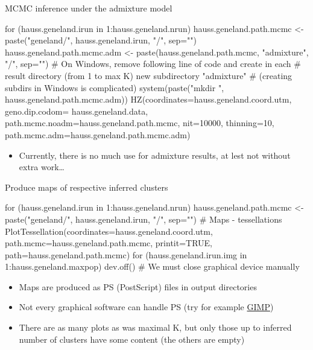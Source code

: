 \documentclass[compress, ucs, xelatex, 11pt, xcolor=svgnames,
  hyperref={
    bookmarks=true,
    unicode=true,
    colorlinks=true,
    pdftitle={Molecular data in R},
    plainpages=false,
    pdfauthor={Vojtech Zeisek},
    pdfsubject={Course about phylogeny and evolution in R},
    pdfcreator={XeLaTeX},
    pdfkeywords={R, evolution, phylogeny, molecular data},
    linkcolor=Tomato,
    anchorcolor=SaddleBrown,
    citecolor=Goldenrod,
    filecolor=DarkMagenta,
    menucolor=Sienna,
    urlcolor=DarkTurquoise,
    pdftex},
  url={hyphens, lowtilde} %
  ]{beamer}
\begin{document}
\begin{frame}[fragile]{MCMC inference under the admixture model}
  \begin{spluscode}
    for (hauss.geneland.irun in 1:hauss.geneland.nrun) {
      hauss.geneland.path.mcmc <- paste("geneland/",
        hauss.geneland.irun, "/", sep="")
      hauss.geneland.path.mcmc.adm <- paste(hauss.geneland.path.mcmc,
        "admixture", "/", sep="")
      # On Windows, remove following line of code and create in each
      # result directory (from 1 to max K) new subdirectory "admixture"
      # (creating subdirs in Windows is complicated)
      system(paste("mkdir ", hauss.geneland.path.mcmc.adm))
      HZ(coordinates=hauss.geneland.coord.utm, geno.dip.codom=
        hauss.geneland.data, path.mcmc.noadm=hauss.geneland.path.mcmc,
        nit=10000, thinning=10,
        path.mcmc.adm=hauss.geneland.path.mcmc.adm)
      }
  \end{spluscode}
  \begin{itemize}
    \item Currently, there is no much use for admixture results, at lest not without extra work\ldots
  \end{itemize}
\end{frame}

\begin{frame}[fragile]{Produce maps of respective inferred clusters}
  \begin{spluscode}
    for (hauss.geneland.irun in 1:hauss.geneland.nrun) {
      hauss.geneland.path.mcmc <- paste("geneland/",
        hauss.geneland.irun, "/", sep="")
      # Maps - tessellations
      PlotTessellation(coordinates=hauss.geneland.coord.utm,
        path.mcmc=hauss.geneland.path.mcmc, printit=TRUE,
        path=hauss.geneland.path.mcmc)
      for (hauss.geneland.irun.img in 1:hauss.geneland.maxpop) {
        dev.off() } # We must close graphical device manually
      }
  \end{spluscode}
  \begin{itemize}
    \item Maps are produced as PS (PostScript) files in output directories
    \item Not every graphical software can handle PS (try for example \href{https://www.gimp.org/}{GIMP})
    \item There are as many plots as was maximal K, but only those up to inferred number of clusters have some content (the others are empty)
  \end{itemize}
\end{frame}
\end{document}
